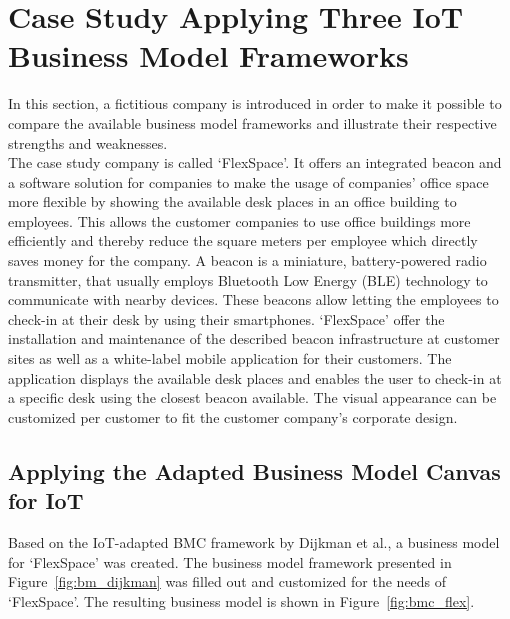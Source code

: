 \section{Case Study Applying Three IoT Business Model Frameworks}
\label{sec:bmf_comparison}
\vspace{-1em}
	In this section, a fictitious company is introduced in order to make it possible to compare the available business model frameworks and illustrate their respective strengths and weaknesses.\\
	The case study company is called `FlexSpace'. It offers an integrated beacon and a software solution for companies to make the usage of companies' office space more flexible by showing the available desk places in an office building to employees. This allows the customer companies to use office buildings more efficiently and thereby reduce the square meters per employee which directly saves money for the company. A beacon is a miniature, battery-powered radio transmitter, that usually employs  Bluetooth Low Energy (BLE) technology to communicate with nearby devices. These beacons allow letting the employees to check-in at their desk by using their smartphones. `FlexSpace' offer the installation and maintenance of the described beacon infrastructure at customer sites as well as a white-label mobile application for their customers. The application displays the available desk places and enables the user to check-in at a specific desk using the closest beacon available. The visual appearance can be customized per customer to fit the customer company's corporate design.
	\vspace{-1em}
	\subsection{Applying the Adapted Business Model Canvas for IoT}
	\vspace{-1em}
		Based on the IoT-adapted BMC framework by Dijkman et al., a business model for `FlexSpace' was created. The business model framework presented in Figure~\ref{fig:bm_dijkman} was filled out and customized for the needs of `FlexSpace'. The resulting business model is shown in Figure~\ref{fig:bmc_flex}.

